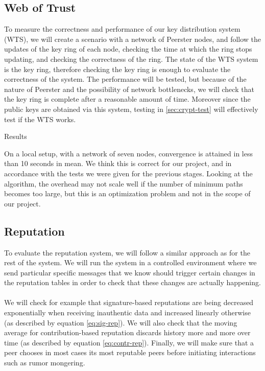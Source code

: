 \documentclass[]{article}
\begin{document}
\subsection{Web of Trust}
To measure the correctness and performance of our key distribution system (WTS), we will create a scenario with a network of Peerster nodes, and follow the updates of the key ring of each node, checking the time at which the ring stops updating, and checking the correctness of the ring. The state of the WTS system is the key ring, therefore checking the key ring is enough to evaluate the correctness of the system. The performance will be tested, but because of the nature of Peerster and the possibility of network bottlenecks, we will check that the key ring is complete after a reasonable amount of time. Moreover since the public keys are obtained via this system, testing in \ref{sec:crypt-test} will effectively test if the WTS works.

Results

On a local setup, with a network of seven nodes, convergence is attained in less than 10 seconds in mean. We think this is correct for our project, and in accordance with the tests we were given for the previous stages. Looking at the algorithm, the overhead may not scale well if the number of minimum paths becomes too large, but this is an optimization problem and not in the scope of our project.

\subsection{Reputation}
To evaluate the reputation system, we will follow a similar approach as for the rest of the system.
We will run the system in a controlled environment where we send particular specific messages that we know should trigger certain changes in the reputation tables in order to check that these changes are actually happening.
\\\\
We will check for example that signature-based reputations are being decreased exponentially when receiving inauthentic data and increased linearly otherwise (as described by equation \ref{eq:sig-rep}).
We will also check that the moving average for contribution-based reputation discards history more and more over time (as described by equation \ref{eq:contr-rep}).
Finally, we will make sure that a peer chooses in most cases its most reputable peers before initiating interactions such as rumor mongering.
\end{document}
